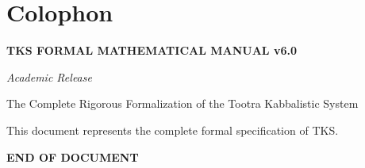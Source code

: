 \documentclass[11pt,twoside,openright]{book}
\theoremstyle{definition}
\theoremstyle{plain}
\theoremstyle{remark}
\begin{document}
\backmatter

\chapter*{Colophon}

\begin{center}
\textbf{TKS FORMAL MATHEMATICAL MANUAL v6.0}

\textit{Academic Release}

The Complete Rigorous Formalization of the Tootra Kabbalistic System

\vspace{2em}

This document represents the complete formal specification of TKS.

\vspace{2em}

\textbf{END OF DOCUMENT}
\end{center}
\end{document}
